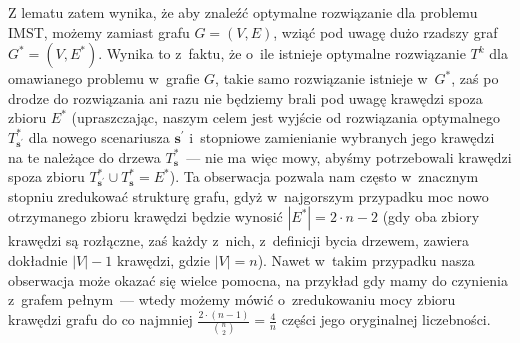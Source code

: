 Z lematu zatem wynika, że aby znaleźć optymalne rozwiązanie dla problemu \textsc{IMST}, możemy zamiast grafu $G = \left( V, E \right)$, wziąć pod uwagę dużo rzadszy graf $G^{\ast} = \left( V, E^{\ast} \right)$.
Wynika to z~faktu, że o~ile istnieje optymalne rozwiązanie $T^{k}$ dla omawianego problemu w~grafie $G$, takie samo rozwiązanie istnieje w~$G^{\ast}$, zaś po drodze do rozwiązania ani razu nie będziemy brali pod uwagę krawędzi spoza zbioru $E^{\ast}$ (upraszczając, naszym celem jest wyjście od rozwiązania optymalnego $T^{\ast}_{\textbf{s}^{\prime}}$ dla nowego scenariusza $\textbf{s}^{\prime}$ i~stopniowe zamienianie wybranych jego krawędzi na te należące do drzewa $T^{\ast}_{\textbf{s}}$~--- nie ma więc mowy, abyśmy potrzebowali krawędzi spoza zbioru $T^{\ast}_{\textbf{s}^{\prime}} \cup T^{\ast}_{\textbf{s}} = E^{\ast}$).
Ta obserwacja pozwala nam często w~znacznym stopniu zredukować strukturę grafu, gdyż w~najgorszym przypadku moc nowo otrzymanego zbioru krawędzi będzie wynosić $\left| E^{\ast} \right| = 2 \cdot n - 2$ (gdy oba zbiory krawędzi są rozłączne, zaś każdy z~nich, z~definicji bycia drzewem, zawiera dokładnie $\left| V \right| - 1$ krawędzi, gdzie $\left| V \right| = n$).
Nawet w~takim przypadku nasza obserwacja może okazać się wielce pomocna, na przykład gdy mamy do czynienia z~grafem pełnym~--- wtedy możemy mówić o~zredukowaniu mocy zbioru krawędzi grafu do co najmniej $\frac{2 \cdot \left( n - 1 \right)}{\binom{n}{2}} = \frac{4}{n}$ części jego oryginalnej liczebności.

